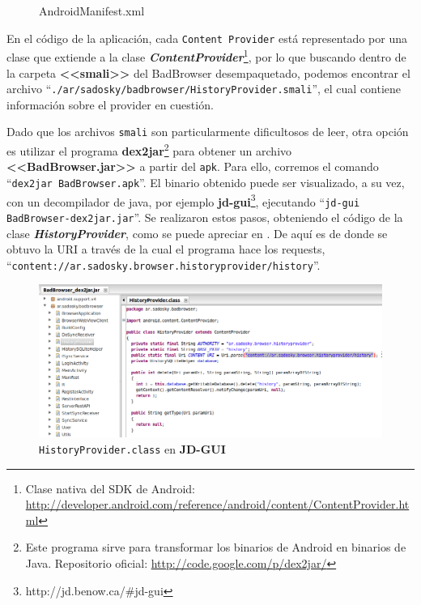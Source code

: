 \documentclass[11pt, a4paper, twoside]{article}
\begin{document}
\begin{figure}[H]

\caption{AndroidManifest.xml}
\label{fig:AndroidManifest}
\end{figure}

En el código de la aplicación, cada \texttt{Content Provider} está representado por una clase que extiende a la clase \textbf{\emph{ContentProvider}}\footnote{Clase nativa del SDK de Android: \url{http://developer.android.com/reference/android/content/ContentProvider.html}}, por lo que buscando dentro de la carpeta \textbf{<<smali>>} del BadBrowser desempaquetado, podemos encontrar el archivo ``\texttt{./ar/sadosky/badbrowser/HistoryProvider.smali}'', el cual contiene información sobre el provider en cuestión.

Dado que los archivos \texttt{smali} son particularmente dificultosos de leer, otra opción es utilizar el programa \textbf{dex2jar}\footnote{Este programa sirve para transformar los binarios de Android en binarios de Java. Repositorio oficial: \url{http://code.google.com/p/dex2jar/}} para obtener un archivo \textbf{<<BadBrowser.jar>>} a partir del \texttt{apk}. Para ello, corremos el comando ``\texttt{dex2jar BadBrowser.apk}''. El binario obtenido puede ser visualizado, a su vez, con un decompilador de java, por ejemplo \textbf{jd-gui}\footnote{http://jd.benow.ca/\#jd-gui}, ejecutando ``\texttt{jd-gui BadBrowser-dex2jar.jar}''. Se realizaron estos pasos, obteniendo el código de la clase \textbf{\emph{HistoryProvider}}, como se puede apreciar en . De aquí es de donde se obtuvo la URI a través de la cual el programa hace los requests, ``\texttt{\color{blue}content://ar.sadosky.browser.historyprovider/history}''.

\begin{center}
\begin{figure}[H]
\includegraphics[scale=0.475]{historyprovider-jdgui.png}
\caption{\texttt{HistoryProvider.class} en \textbf{JD-GUI}}
\label{fig:historyprovider-jdgui}
\end{figure}
\end{center}
\end{document}
